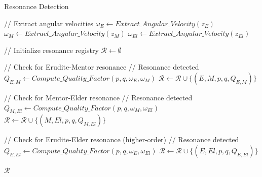 \begin{algorithm}
\caption{Resonance Detection}
\begin{algorithmic}[1]
    \State // Extract angular velocities
    \State $\omega_E \gets Extract\_Angular\_Velocity(z_E)$
    \State $\omega_M \gets Extract\_Angular\_Velocity(z_M)$
    \State $\omega_{El} \gets Extract\_Angular\_Velocity(z_{El})$
    
    \State // Initialize resonance registry
    \State $\mathcal{R} \gets \emptyset$
    
    \State // Check for Erudite-Mentor resonance
                \State // Resonance detected
                \State $Q_{E,M} \gets Compute\_Quality\_Factor(p, q, \omega_E, \omega_M)$
                    \State $\mathcal{R} \gets \mathcal{R} \cup \{(E, M, p, q, Q_{E,M})\}$
                \EndIf
            \EndIf
        \EndFor
    \EndFor
    
    \State // Check for Mentor-Elder resonance
                \State // Resonance detected
                \State $Q_{M,El} \gets Compute\_Quality\_Factor(p, q, \omega_M, \omega_{El})$
                    \State $\mathcal{R} \gets \mathcal{R} \cup \{(M, El, p, q, Q_{M,El})\}$
                \EndIf
            \EndIf
        \EndFor
    \EndFor
    
    \State // Check for Erudite-Elder resonance (higher-order)
                \State // Resonance detected
                \State $Q_{E,El} \gets Compute\_Quality\_Factor(p, q, \omega_E, \omega_{El})$
                    \State $\mathcal{R} \gets \mathcal{R} \cup \{(E, El, p, q, Q_{E,El})\}$
                \EndIf
            \EndIf
        \EndFor
    \EndFor
    
    \State \Return $\mathcal{R}$
\EndFunction
\end{algorithmic}
\end{algorithm}

